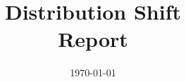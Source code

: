 \documentclass[a4paper,12pt]{report}
\institute{UniTs - University of Trieste}
\title{Distribution Shift\\Report}
\date{\today}
\begin{document}
\maketitle



\toc



\printbibliography
\end{document}
